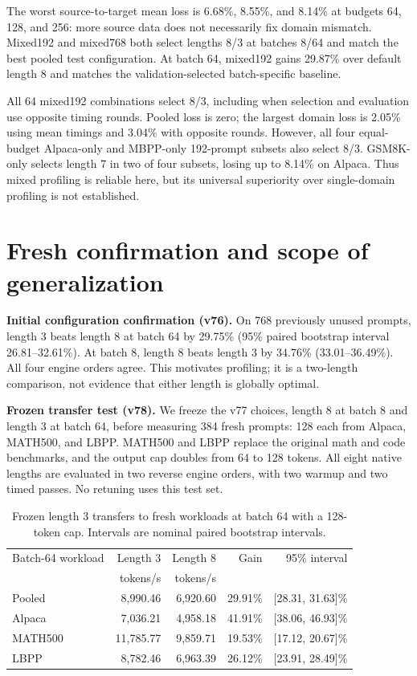 \documentclass[10pt]{article}
\begin{document}
The worst source-to-target mean loss is 6.68\%, 8.55\%, and 8.14\% at budgets 64, 128, and 256: more source data does not necessarily fix domain mismatch. Mixed192 and mixed768 both select lengths 8/3 at batches 8/64 and match the best pooled test configuration. At batch 64, mixed192 gains 29.87\% over default length 8 and matches the validation-selected batch-specific baseline.

All 64 mixed192 combinations select 8/3, including when selection and evaluation use opposite timing rounds. Pooled loss is zero; the largest domain loss is 2.05\% using mean timings and 3.04\% with opposite rounds. However, all four equal-budget Alpaca-only and MBPP-only 192-prompt subsets also select 8/3. GSM8K-only selects length 7 in two of four subsets, losing up to 8.14\% on Alpaca. Thus mixed profiling is reliable here, but its universal superiority over single-domain profiling is not established.

\newpage
\section{Fresh confirmation and scope of generalization}
\textbf{Initial configuration confirmation (v76).} On 768 previously unused prompts, length 3 beats length 8 at batch 64 by 29.75\% (95\% paired bootstrap interval 26.81--32.61\%). At batch 8, length 8 beats length 3 by 34.76\% (33.01--36.49\%). All four engine orders agree. This motivates profiling; it is a two-length comparison, not evidence that either length is globally optimal.

\textbf{Frozen transfer test (v78).} We freeze the v77 choices, length 8 at batch 8 and length 3 at batch 64, before measuring 384 fresh prompts: 128 each from Alpaca, MATH500, and LBPP. MATH500 and LBPP replace the original math and code benchmarks, and the output cap doubles from 64 to 128 tokens. All eight native lengths are evaluated in two reverse engine orders, with two warmup and two timed passes. No retuning uses this test set.

\begin{table}[h]\centering\small
\begin{tabular}{@{}lrrrr@{}}\toprule
Batch-64 workload & Length 3 & Length 8 & Gain & 95\% interval \\
 & tokens/s & tokens/s & & \\\midrule
Pooled & 8,990.46 & 6,920.60 & 29.91\% & [28.31, 31.63]\% \\
Alpaca & 7,036.21 & 4,958.18 & 41.91\% & [38.06, 46.93]\% \\
MATH500 & 11,785.77 & 9,859.71 & 19.53\% & [17.12, 20.67]\% \\
LBPP & 8,782.46 & 6,963.39 & 26.12\% & [23.91, 28.49]\% \\\bottomrule
\end{tabular}
\caption{Frozen length 3 transfers to fresh workloads at batch 64 with a 128-token cap. Intervals are nominal paired bootstrap intervals.}
\end{table}
\end{document}
